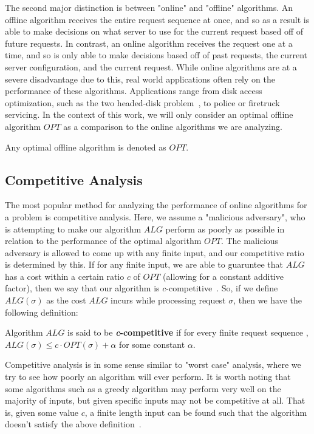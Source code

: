 The second major distinction is between "online" and "offline" algorithms. An offline algorithm receives the entire request sequence at once, and so as a result is able to make decisions on what server to use for the current request based off of future requests. In contrast, an online algorithm receives the request one at a time, and so is only able to make decisions based off of past requests, the current server configuration, and the current request. While online algorithms are at a severe disadvantage due to this, real world applications often rely on the performance of these algorithms. Applications range from disk access optimization, such as the two headed-disk problem~\cite{OnlineComp1998}, to police or firetruck servicing. In the context of this work, we will only consider an optimal offline algorithm $OPT$ as a comparison to the online algorithms we are analyzing.

\begin{definition}
Any optimal offline algorithm is denoted as $OPT$.
\end{definition}

\subsection{Competitive Analysis}
\label{sec:compAna}
The most popular method for analyzing the performance of online algorithms for a problem is competitive analysis. Here, we assume a "malicious adversary", who is attempting to make our algorithm $ALG$ perform as poorly as possible in relation to the performance of the optimal algorithm $OPT$. The malicious adversary is allowed to come up with any finite input, and our competitive ratio is determined by this. If for any finite input, we are able to guaruntee that $ALG$ has a cost within a certain ratio $c$ of $OPT$ (allowing for a constant additive factor), then we say that our algorithm is $c$-competitive~\cite{OnlineComp1998}. So, if we define $ALG(\sigma)$ as the cost $ALG$ incurs while processing request $\sigma$, then we have the following definition: 

\begin{definition}
\label{def:comp}
Algorithm $ALG$ is said to be \textbf{\textit{c}-competitive} if for every finite request sequence \s, $ALG(\sigma) \leq c\cdot OPT(\sigma)+\alpha$ for some constant $\alpha$.
\end{definition}

Competitive analysis is in some sense similar to "worst case" analysis, where we try to see how poorly an algorithm will ever perform. It is worth noting that some algorithms such as a greedy algorithm may perform very well on the majority of inputs, but given specific inputs may not be competitive at all. That is, given some value $c$, a finite length input can be found such that the algorithm doesn't satisfy the above definition~\cite{OnlineComp1998}.

